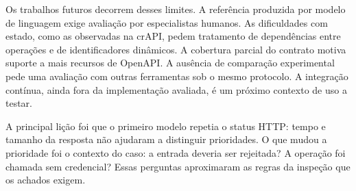 Os trabalhos futuros decorrem desses limites. A referência produzida por
modelo de linguagem exige avaliação por especialistas humanos. As dificuldades
com estado, como as observadas na crAPI, pedem tratamento de dependências entre
operações e de identificadores dinâmicos. A cobertura parcial do contrato
motiva suporte a mais recursos de OpenAPI. A ausência de comparação
experimental pede uma avaliação com outras ferramentas sob o mesmo protocolo.
A integração contínua, ainda fora da implementação avaliada, é um próximo
contexto de uso a testar.

A principal lição foi que o primeiro modelo repetia o status HTTP: tempo e
tamanho da resposta não ajudaram a distinguir prioridades. O que mudou a
prioridade foi o contexto do caso: a entrada deveria ser rejeitada? A operação
foi chamada sem credencial? Essas perguntas aproximaram as regras da inspeção
que os achados exigem.
